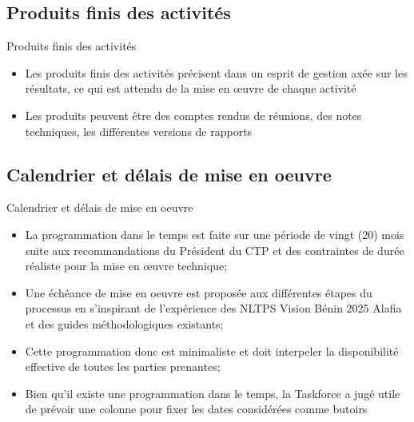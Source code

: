 \documentclass[11pt]{beamer}
\begin{document}
\subsection{\tiny Produits finis des activités}
\begin{frame}{Produits finis des activités}
  \begin{itemize} [<+->]
  \item  Les produits finis des activités précisent dans un esprit de gestion axée sur les résultats, ce qui est attendu de la mise en œuvre de chaque activité \vfill
 \item Les produits peuvent être des comptes rendus de réunions, des notes techniques, les différentes versions de rapports  \vfill
 \end{itemize}
\end{frame}

\subsection{\tiny Calendrier et  délais de mise en oeuvre}
\begin{frame}{Calendrier et  délais de mise en oeuvre}
  \begin{itemize} [<+->]
  \item  La programmation dans le temps est faite sur une période de vingt (20) mois suite aux recommandations du Président du CTP et des contraintes de durée réaliste pour la mise en œuvre technique; \vfill
 \item Une échéance de mise en oeuvre est proposée aux différentes étapes du processus en s’inspirant de l’expérience des NLTPS Vision Bénin 2025 Alafia et des guides méthodologiques existants; \vfill
\item  Cette programmation donc est minimaliste et doit interpeler la disponibilité effective de toutes les parties prenantes; \vfill
\item   Bien qu’il existe une programmation dans le temps, la Taskforce a jugé utile de prévoir une colonne pour fixer les dates considérées comme butoirs \vfill
 \end{itemize}
\end{frame}
\end{document}
